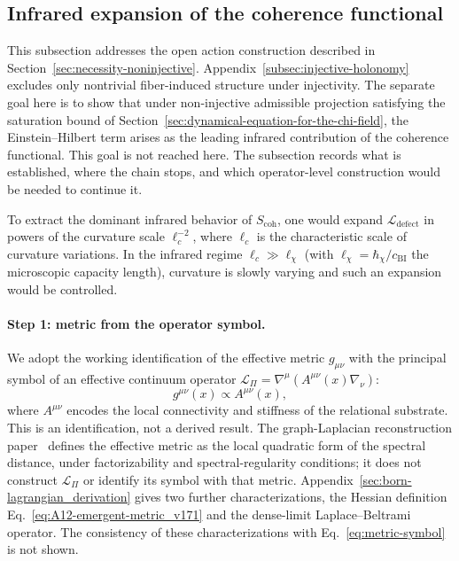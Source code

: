 \subsection{Infrared expansion of the coherence functional}
  \label{subsec:IR}

  This subsection addresses the open action construction described in
  Section~\ref{sec:necessity-noninjective}.
  Appendix~\ref{subsec:injective-holonomy} excludes only nontrivial fiber-induced structure under injectivity.
  The separate goal here is to show that under non-injective admissible projection
  satisfying the saturation bound of Section~\ref{sec:dynamical-equation-for-the-chi-field},
  the Einstein--Hilbert term arises as the leading infrared contribution of the coherence functional.
  This goal is not reached here.
  The subsection records what is established, where the chain stops, and which operator-level construction
  would be needed to continue it.

  To extract the dominant infrared behavior of $S_{\mathrm{coh}}$, one would expand
  $\mathcal{L}_{\mathrm{defect}}$ in powers of the curvature scale $\ell_c^{-2}$,
  where $\ell_c$ is the characteristic scale of curvature variations.
  In the infrared regime $\ell_c \gg \ell_\chi$ (with $\ell_\chi = \hbar_\chi / c_{\mathrm{BI}}$
  the microscopic capacity length), curvature is slowly varying and such an expansion would be
  controlled.

  \paragraph{Step 1: metric from the operator symbol.}
    We adopt the working identification of the effective metric $g_{\mu\nu}$ with the principal symbol of an
    effective continuum operator $\mathcal{L}_\Pi = \nabla^\mu(A^{\mu\nu}(x) \nabla_\nu)$:
    \begin{equation}
      g^{\mu\nu}(x) \propto A^{\mu\nu}(x),
      \label{eq:metric-symbol}
    \end{equation}
    where $A^{\mu\nu}$ encodes the local connectivity and stiffness of the relational substrate.
    This is an identification, not a derived result.
    The graph-Laplacian reconstruction paper~\cite{Beau2026a} defines the effective metric as the local
    quadratic form of the spectral distance, under factorizability and spectral-regularity conditions;
    it does not construct $\mathcal{L}_\Pi$ or identify its symbol with that metric.
    Appendix~\ref{sec:born-lagrangian_derivation} gives two further characterizations, the Hessian definition
    Eq.~\eqref{eq:A12-emergent-metric_v171} and the dense-limit Laplace--Beltrami operator.
    The consistency of these characterizations with Eq.~\eqref{eq:metric-symbol} is not shown.

